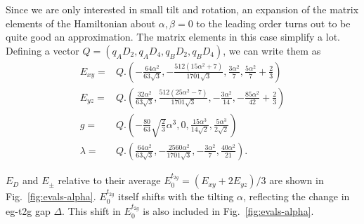 \documentclass[a4paper,prb]{revtex4-1}  %
\begin{document}
Since we are only interested in small tilt and rotation,
an expansion of the matrix elements of the Hamiltonian about 
${\alpha,\beta=0}$
to the leading order turns out to be quite good an approximation.
The matrix elements in this case simplify a lot.
Defining a vector ${Q = \left( q_A D_2, q_A D_4, q_B D_2,q_B D_4  \right)}$,
 we can write them as
\begin{align}
E_{xy}=& Q.
\left(-\frac{64 \alpha ^2}{63 \sqrt{3}},-\frac{512 \left(15 \alpha ^2+7\right)}{1701 \sqrt{3}},\frac{3\alpha ^2}{7} ,\frac{5 \alpha ^2}{7}+\frac{2}{3}\right)\\
E_{yz}=& Q.
\left(\frac{32 \alpha ^2}{63 \sqrt{3}},\frac{512 \left(25 \alpha ^2-7\right)}{1701 \sqrt{3}},-\frac{3 \alpha ^2}{14},-\frac{85 \alpha ^2}{42}+\frac{2}{3}\right)\\
g=& Q.
\left(-\frac{80}{63} \sqrt{\frac{2}{3}} \alpha ^3,0,\frac{15 \alpha ^3}{14 \sqrt{2}},\frac{5 \alpha ^3}{2 \sqrt{2}}\right)\\
\lambda=& Q.
\left(\frac{64 \alpha ^2}{63 \sqrt{3}},-\frac{2560 \alpha ^2}{1701 \sqrt{3}},-\frac{3 \alpha ^2}{7},\frac{40 \alpha ^2}{21}\right).
\end{align}


$E_D$ and $E_{\pm}$ relative to their average ${E_0^{t_{2g}}= \left(E_{xy} + 2 E_{yz}\right)/3}$
are shown in Fig.~\ref{fig:evals-alpha}.
$E_0^{t_{2g}}$ itself shifts 
with the tilting $\alpha$, 
reflecting 
the change in eg-t2g gap $\Delta$.
This shift in $E_0^{t_{2g}}$ is
also included in Fig.~\ref{fig:evals-alpha}.
\end{document}
